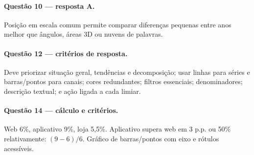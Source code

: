 \paragraph{Questão 10 — resposta A.} Posição em escala comum permite comparar diferenças pequenas entre anos melhor que ângulos, áreas 3D ou nuvens de palavras.
\paragraph{Questão 12 — critérios de resposta.} Deve priorizar situação geral, tendências e decomposição; usar linhas para séries e barras/pontos para canais; cores redundantes; filtros essenciais; denominadores; descrição textual; e ação ligada a cada limiar.
\paragraph{Questão 14 — cálculo e critérios.} Web 6\%, aplicativo 9\%, loja 5,5\%. Aplicativo supera web em 3 p.p. ou 50\% relativamente: $(9-6)/6$. Gráfico de barras/pontos com eixo e rótulos acessíveis.
